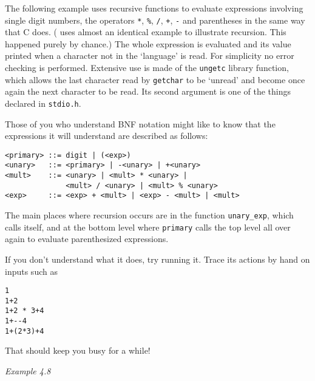    The following example uses recursive functions to evaluate expressions
    involving single digit numbers, the operators \texttt{*},
    \texttt{\%}, \texttt{/}, \texttt{+}, \texttt{-} and
    parentheses in the same way that C does. (\cite{Stro} uses
    almost an identical example to illustrate recursion. This happened
    purely by chance.) The whole expression is evaluated and its value
    printed when a character not in the `language' is read. For
    simplicity no error checking is performed. Extensive use is made of the
    \texttt{ungetc} library function, which allows the last character
    read by \texttt{getchar} to be `unread' and become once again
    the next character to be read. Its second argument is one of the things
    declared in \texttt{stdio.h}.


   Those of you who understand BNF notation might like to know that the
    expressions it will understand are described as follows:

\begin{Verbatim}
<primary> ::= digit | (<exp>)
<unary>   ::= <primary> | -<unary> | +<unary>
<mult>    ::= <unary> | <mult> * <unary> |
              <mult> / <unary> | <mult> % <unary>
<exp>     ::= <exp> + <mult> | <exp> - <mult> | <mult>
\end{Verbatim}

   The main places where recursion occurs are in the function
    \texttt{unary\_exp}, which calls itself, and at the bottom level
    where \texttt{primary} calls the top level all over again to
    evaluate parenthesized expressions.


   If you don't understand what it does, try running it. Trace its
    actions by hand on inputs such as

\begin{Verbatim}
1
1+2
1+2 * 3+4
1+--4
1+(2*3)+4
\end{Verbatim}

   That should keep you busy for a while!


   \begin{center}\textit{Example 4.8}\end{center}


  


